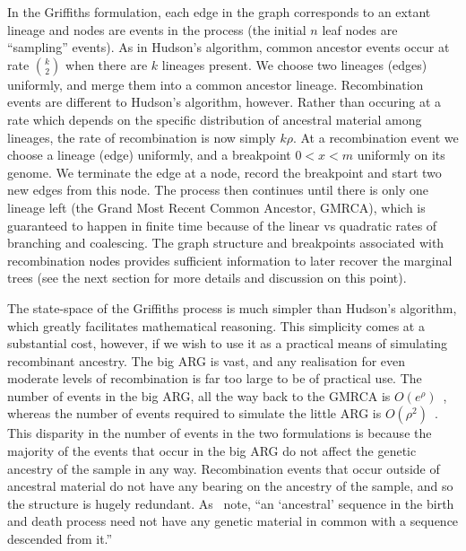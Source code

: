 \documentclass{article}
\begin{document}
In the Griffiths formulation, each edge in the graph corresponds to an extant
lineage and nodes are events in the process (the initial $n$ leaf nodes are
``sampling'' events). As in Hudson's
algorithm, common ancestor events occur at rate $\binom{k}{2}$ when there
are $k$ lineages present. We choose two lineages (edges) uniformly, and merge them
into a common ancestor lineage. Recombination events are different
to Hudson's algorithm, however. Rather than occuring at a rate which depends on
the specific distribution of ancestral material among lineages, the
rate of recombination is now simply $k \rho$. At a recombination event
we choose a lineage (edge) uniformly, and a
breakpoint $0 < x < m$ uniformly on its genome. We terminate the edge at a
node, record the breakpoint and start two new edges from this node. The process
then continues until there is only one lineage left (the Grand Most Recent
Common Ancestor, GMRCA), which is guaranteed to
happen in finite time because of the linear vs quadratic rates of branching
and coalescing. The graph structure and breakpoints associated with
recombination nodes provides sufficient information to later recover the marginal
trees (see the next section for more details and discussion on this point).

The state-space of the Griffiths process is much simpler than Hudson's algorithm,
which greatly facilitates mathematical reasoning. This simplicity comes at a
substantial cost, however, if we wish to use it as a practical means of
simulating recombinant ancestry. The big ARG is vast, and any realisation
for even moderate levels of recombination is far too large to be of practical
use. The number of events in the big ARG, all the way back to the GMRCA
is $O(e^\rho)$~\citep{griffiths1997ancestral}, whereas the number
of events required to simulate the little ARG is
$O(\rho^2)$~\citep{hein2004gene,baumdicker2021efficient}.
This disparity in the number of events in the two formulations is
because the majority of the events that occur in the big ARG do
not affect the genetic ancestry of the sample in any way. Recombination
events that occur outside of ancestral material do not have any bearing
on the ancestry of the sample, and so the structure is hugely redundant.
As~\cite{wiuf1999recombination} note,
``an `ancestral' sequence in the birth and death process
need not have any genetic material in common with a
sequence descended from it.''

\end{document}
